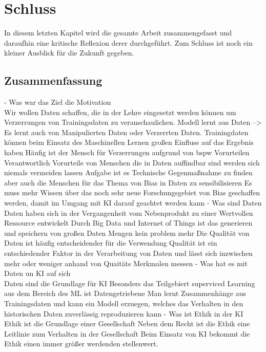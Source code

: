 \chapter{Schluss}
\label{sec:schluss}
In diesem letzten Kapitel wird die gesamte Arbeit zusammengefasst und daraufhin eine kritische Reflexion derer durchgeführt. Zum Schluss ist noch ein kleiner Ausblick für die Zukunft gegeben.
\section{Zusammenfassung}
\label{zusammenfassung}
- Was war das Ziel die Motivation\\
    Wir wollen Daten schaffen, die in der Lehre eingesetzt werden können um Verzerrungen von Trainingsdaten zu veranschaulichen.
    Modell lernt aus Daten --> Es lernt auch von Manipulierten Daten oder Verzerrten Daten.
    Trainingdaten können beim Einsatz des Maschinellen Lernen großen Einfluss auf das Ergebnis haben
    Häufig ist der Mensch für Verzerrungen aufgrund von bspw Vorurteilen Verantwortlich
    Vorurteile von Menschen die in Daten auffindbar sind werden sich niemals vermeiden lassen
    Aufgabe ist es Technische Gegenmaßnahme zu finden aber auch die Menschen für das Thema von Bias in Daten zu sensibilisieren
    Es muss mehr Wissen über das noch sehr neue Forschungsgebiet von Bias geschaffen werden, damit im Umgang mit KI darauf geachtet werden kann
- Was sind Daten\\
    Daten haben sich in der Vergangenheit vom Nebenprodukt zu einer Wertvollen Ressource entwickelt
    Durch Big Data und Internet of Things ist das generieren und speichern von großen Daten Mengen kein problem mehr
    Die Qualität von Daten ist häufig entscheidender für die Verwendung
    Qualität ist ein entschiedender Faktor in der Verarbeitung von Daten und lässt sich inzwischen mehr oder weniger anhand von Quaitäts Merkmalen messen
- Was hat es mit Daten un KI auf sich\\
    Daten sind die Grundlage für KI
    Besonders das Teilgebiert superviced Learning aus dem Bereich des ML ist Datengetriebene
    Man lernt Zusammenhänge aus Trainingsdaten und kann ein Modell erzuegen, welches das Verhalten in den historischen Daten zuverlässig reproduzieren kann
- Was ist Ethik in der KI \\
    Ethik ist die Grundlage einer Gesellschaft
    Neben dem Recht ist die Ethik eine Leitlinie zum Verhalten in der Gesellschaft 
    Beim Einsatz von KI bekommt die Ethik einen immer größer werdenden stellenwert.
